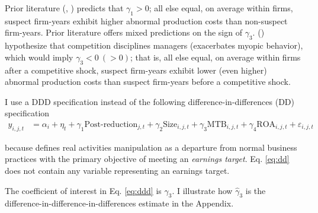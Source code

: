\documentclass[notitlepage, 12pt]{article}
\begin{document}
\noindent Prior literature (\citet{roychowdhury:2006}, \citet{gunny:2010}) predicts that $\gamma_{1} > 0$; all else equal, on average within firms, suspect firm-years exhibit higher abnormal production costs than non-suspect firm-years. Prior literature offers mixed predictions on the sign of $\gamma_{3}$. \citet{bc:2012} (\citet{kst:2012}) hypothesize that competition disciplines managers (exacerbates myopic behavior), which would imply $\gamma_{3} < 0 \ (> 0)$; that is, all else equal, on average within firms after a competitive shock, suspect firm-years exhibit lower (even higher) abnormal production costs than suspect firm-years before a competitive shock.
\newline

\noindent I use a DDD specification instead of the following difference-in-differences (DD) specification
\begin{align}\label{eq:dd}
y_{i,j,t} &= \alpha_{i} + \eta_{t} + \gamma_{1}\text{Post-reduction}_{j,t} + \gamma_{2}\text{Size}_{i,j,t} + \gamma_{3}\text{MTB}_{i,j,t} + \gamma_{4}\text{ROA}_{i,j,t} + \varepsilon_{i,j,t}
\end{align}

\noindent because \citet{roychowdhury:2006} defines real activities manipulation as a departure from normal business practices with the primary objective of meeting an \textit{earnings target}. Eq. \eqref{eq:dd} does not contain any variable representing an earnings target.
\newline

\noindent The coefficient of interest in Eq. \eqref{eq:ddd} is $\gamma_{3}$. I illustrate how $\widehat{\gamma}_{3}$ is the difference-in-difference-in-differences estimate in the Appendix.
\end{document}

